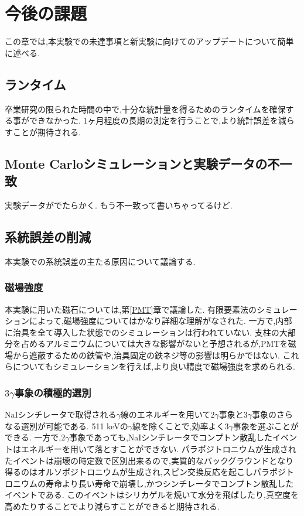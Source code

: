 \chapter{今後の課題}\label{prospect}

この章では,本実験での未達事項と新実験に向けてのアップデートについて簡単に述べる.

\section{ランタイム}
卒業研究の限られた時間の中で,十分な統計量を得るためのランタイムを確保する事ができなかった.
1ヶ月程度の長期の測定を行うことで,より統計誤差を減らすことが期待される.

\section{Monte Carloシミュレーションと実験データの不一致}
実験データがでたらかく.
もう不一致って書いちゃってるけど.

\section{系統誤差の削減}
本実験での系統誤差の主たる原因について議論する.

\subsection{磁場強度}
本実験に用いた磁石については,第\ref{PMT}章で議論した.
有限要素法のシミュレーションによって,磁場強度についてはかなり詳細な理解がなされた.
一方で,内部に治具を全て導入した状態でのシミュレーションは行われていない.
支柱の大部分を占めるアルミニウムについては大きな影響がないと予想されるが,PMTを磁場から遮蔽するための鉄管や,治具固定の鉄ネジ等の影響は明らかではない.
これらについてもシミュレーションを行えば,より良い精度で磁場強度を求められる.

\subsection{$3\gamma$事象の積極的選別}
NaIシンチレータで取得される$\gamma$線のエネルギーを用いて$2\gamma$事象と$3\gamma$事象のさらなる選別が可能である.
511 keVの$\gamma$線を除くことで,効率よく$3\gamma$事象を選ぶことができる.
一方で,$2\gamma$事象であっても,NaIシンチレータでコンプトン散乱したイベントはエネルギーを用いて落とすことができない.
パラポジトロニウムが生成されたイベントは崩壊の時定数で区別出来るので,実質的なバックグラウンドとなり得るのはオルソポジトロニウムが生成され,スピン交換反応を起こしパラポジトロニウムの寿命より長い寿命で崩壊し,かつシンチレータでコンプトン散乱したイベントである.
このイベントはシリカゲルを焼いて水分を飛ばしたり,真空度を高めたりすることでより減らすことができると期待される.


